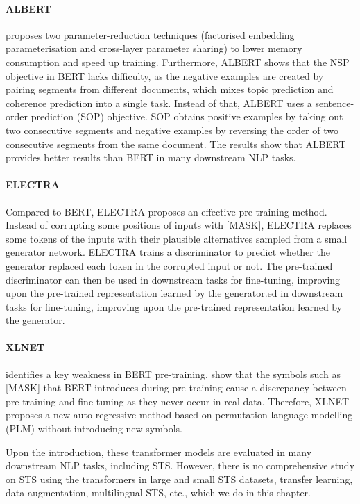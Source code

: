 \paragraph{ALBERT} \autocite{Lan2020ALBERT} proposes two parameter-reduction techniques (factorised embedding parameterisation and cross-layer parameter sharing) to lower memory consumption and speed up training. Furthermore, ALBERT \autocite{Lan2020ALBERT} shows that the NSP objective in BERT lacks difficulty, as the negative examples are created by pairing segments from different documents, which mixes topic prediction and coherence prediction into a single task. Instead of that, ALBERT uses a sentence-order prediction (SOP) objective. SOP obtains positive examples by taking out two consecutive segments and negative examples by reversing the order of two consecutive segments from the same document. The results show that ALBERT provides better results than BERT in many downstream NLP tasks.


\paragraph{ELECTRA} Compared to BERT, ELECTRA \autocite{Clark2020ELECTRA} proposes an effective pre-training method. Instead of corrupting some positions of inputs with [MASK], ELECTRA replaces some tokens of the inputs with their plausible alternatives sampled from a small generator network. ELECTRA trains a discriminator to predict whether the generator replaced each token in the corrupted input or not. The pre-trained discriminator can then be used in downstream tasks for fine-tuning, improving upon the pre-trained representation learned by the generator.ed in downstream tasks for fine-tuning, improving upon the pre-trained representation learned by the generator.

\paragraph{XLNET} \autocite{yang2019xlnet} identifies a key weakness in BERT pre-training. \textcite{yang2019xlnet} show that the symbols such as \textsc{[MASK]} that BERT introduces during pre-training cause a discrepancy between pre-training and fine-tuning as they never occur in real data. Therefore, XLNET proposes a new auto-regressive method based on permutation language modelling (PLM) \autocite{JMLR:v17:16-272} without introducing new symbols. 

Upon the introduction, these transformer models are evaluated in many downstream NLP tasks, including STS. However, there is no comprehensive study on STS using the transformers in large and small STS datasets, transfer learning, data augmentation, multilingual STS, etc., which we do in this chapter.

